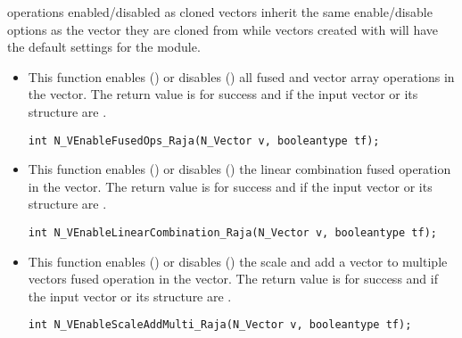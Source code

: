 operations enabled/disabled as cloned vectors inherit the same enable/disable
options as the vector they are cloned from while vectors created with
 will have the default settings for the {\nvecraja} module.
\begin{itemize}


\item {}

This function enables () or disables () all fused and
vector array operations in the {\raja} vector. The return value is  for
success and  if the input vector or its  structure are .

\verb|int N_VEnableFusedOps_Raja(N_Vector v, booleantype tf);|


\item {}

This function enables () or disables () the linear
combination fused operation in the {\raja} vector. The return value is  for
success and  if the input vector or its  structure are .

\verb|int N_VEnableLinearCombination_Raja(N_Vector v, booleantype tf);|


\item {}

This function enables () or disables () the scale and
add a vector to multiple vectors fused operation in the {\raja} vector. The
return value is  for success and  if the input vector or its
 structure are .

\verb|int N_VEnableScaleAddMulti_Raja(N_Vector v, booleantype tf);|





\end{itemize}
